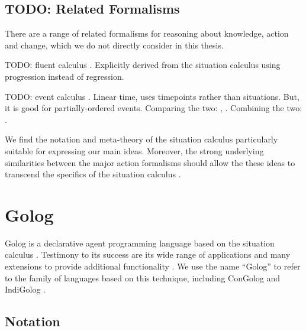 \subsection{TODO: Related Formalisms}

There are a range of related formalisms for reasoning about knowledge,
action and change, which we do not directly consider in this thesis.

TODO: fluent calculus \citep{thielscher99fluentcalc}. Explicitly
derived from the situation calculus using progression instead of regression.

TODO: event calculus \citep{kowalski86event_calculus}. Linear time,
uses timepoints rather than situations. But, it is good for partially-ordered
events. Comparing the two: \citet{kowalski97reconcile_sitcalc_evtcalc},
\citet{belleghem97sitcalc_evtcalc}. Combining the two: \citet{belleghem95combine_sitcalc_evtcalc}
.

We find the notation and meta-theory of the situation calculus particularly
suitable for expressing our main ideas. Moreover, the strong underlying
similarities between the major action formalisms should allow the
these ideas to transcend the specifics of the situation calculus \citet{thielscher06reconcile_sc_fc,thielscher07unifying_action_calculus,vanbentham07ml_sitcalc}.


\section{Golog\label{sec:Background:Golog}}

Golog is a declarative agent programming language based on the situation
calculus \citep{levesque97golog}. Testimony to its success are its
wide range of applications and many extensions to provide additional
functionality \citep{giacomo00congolog,giacomo99indigolog,Ferrein2005readylog}.
We use the name {}``Golog'' to refer to the family of languages
based on this technique, including ConGolog \citep{giacomo00congolog}
and IndiGolog \citep{giacomo99indigolog}.


\subsection{Notation}

